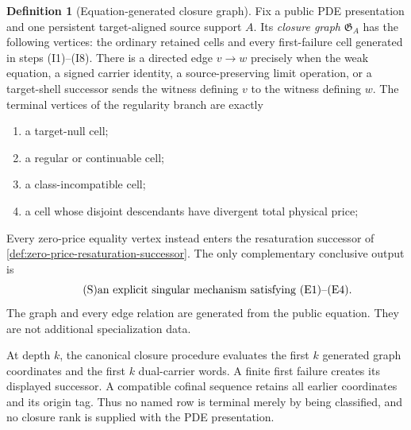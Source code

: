 \documentclass[11pt]{article}
\numberwithin{section}{part}
\theoremstyle{plain}
\theoremstyle{definition}
\newtheorem{definition}[definition]{Definition}
\theoremstyle{remark}
\begin{document}
\begin{definition}[Equation-generated closure graph]
\label{def:equation-generated-closure-graph}
Fix a public PDE presentation and one persistent target-aligned source support
\(A\).  Its \emph{closure graph} \(\mathfrak G_A\) has the following vertices:
the ordinary retained cells and every first-failure cell generated in
steps \textup{(I1)}--\textup{(I8)}.  There is a directed edge
\(v\to w\) precisely when the weak equation, a signed carrier identity, a
source-preserving limit operation, or a target-shell successor sends the
witness defining \(v\) to the witness defining \(w\).  The terminal vertices
of the regularity branch are exactly
\begin{enumerate}[label=\textup{(T\arabic*)}]
\item a target-null cell;
\item a regular or continuable cell;
\item a class-incompatible cell;
\item a cell whose disjoint descendants have divergent total physical price;
\end{enumerate}
Every zero-price equality vertex instead enters the resaturation successor of
\cref{def:zero-price-resaturation-successor}.  The only complementary
conclusive output is
\begin{equation*}
 \tag{S}\label{eq:explicit-singular-terminal}
 \text{an explicit singular mechanism satisfying \textup{(E1)}--\textup{(E4)}.}
\end{equation*}
The graph and every edge relation are generated from the public equation.
They are not additional specialization data.

At depth \(k\), the canonical closure procedure evaluates the first \(k\)
generated graph coordinates and the first \(k\) dual-carrier words.  A finite
first failure creates its displayed successor.  A compatible cofinal sequence
retains all earlier coordinates and its origin tag.  Thus no named row is
terminal merely by being classified, and no closure rank is supplied with the
PDE presentation.
\end{definition}
\end{document}
